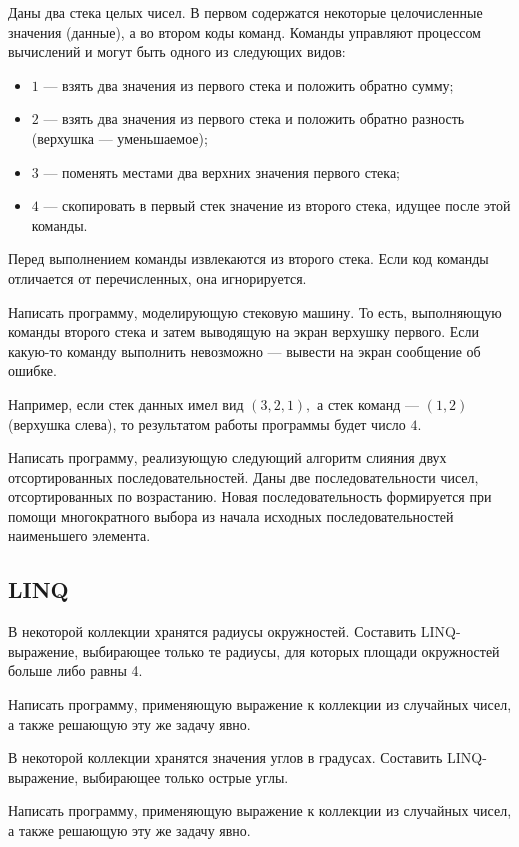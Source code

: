 \task Даны два стека целых чисел. В первом содержатся некоторые
целочисленные значения (данные), а во втором коды команд. Команды
управляют процессом вычислений и могут быть одного из следующих видов:
\begin{itemize}
\item $1$ — взять два значения из первого стека и положить обратно
  сумму;
\item $2$ — взять два значения из первого стека и положить обратно
  разность (верхушка — уменьшаемое);
\item $3$ — поменять местами два верхних значения первого стека;
\item $4$ — скопировать в первый стек значение из второго стека,
  идущее после этой команды.
\end{itemize}
Перед выполнением команды извлекаются из второго стека. Если код
команды отличается от перечисленных, она игнорируется.

Написать программу, моделирующую стековую машину. То есть, выполняющую команды второго стека и затем выводящую
на экран верхушку первого. Если какую-то команду выполнить невозможно
— вывести на экран сообщение об ошибке.

Например, если стек данных имел вид $(3, 2, 1),$ а стек команд —
$(1, 2)$ (верхушка слева), то результатом работы программы будет число
$4$.

\task Написать программу, реализующую следующий алгоритм слияния двух
отсортированных последовательностей. Даны две последовательности
чисел, отсортированных по возрастанию. Новая последовательность
формируется при помощи многократного выбора из начала исходных
последовательностей наименьшего элемента.


\subsection{LINQ}

\task В некоторой коллекции хранятся радиусы окружностей. Составить
LINQ-выражение, выбирающее только те радиусы, для которых площади
окружностей больше либо равны 4.

Написать программу, применяющую выражение к коллекции из случайных
чисел, а также решающую эту же задачу явно.

\task В некоторой коллекции хранятся значения углов в
градусах. Составить LINQ-выражение, выбирающее только острые углы.

Написать программу, применяющую выражение к коллекции из случайных
чисел, а также решающую эту же задачу явно.

